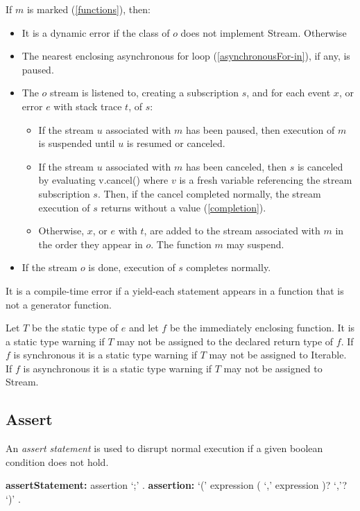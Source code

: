 \documentclass{article}
\newcommand{\code}[1]{{\sf #1}}
\begin{document}
\LMHash{}
If $m$ is marked \ASYNC* (\ref{functions}), then:
\begin{itemize}
\item  It is a dynamic error if the class of $o$ does not implement \code{Stream}. Otherwise
\item The nearest enclosing asynchronous for loop (\ref{asynchronousFor-in}), if any, is paused.
\item The $o$ stream is listened to, creating a subscription $s$, and for each event $x$, or error $e$ with stack trace $t$, of $s$:
\begin{itemize}
\item
If the stream $u$ associated with $m$ has been paused, then execution of $m$ is suspended until $u$ is resumed or canceled.
\item
If the stream $u$ associated with $m$ has been canceled,
then $s$ is canceled by evaluating \code{\AWAIT{} v.cancel()} where $v$ is a fresh variable referencing the stream subscription $s$.
Then, if the cancel completed normally, the stream execution of $s$ returns without a value (\ref{completion}).
\item
Otherwise, $x$, or $e$ with $t$, are added to the stream associated with $m$ in the order they appear in $o$.  The function $m$ may suspend.
\end{itemize}
\item If the stream $o$ is done, execution of $s$ completes normally.
\end{itemize}


\LMHash{}
It is a compile-time error if a yield-each statement appears in a function that is not a generator function.

\LMHash{}
Let $T$ be the static type of $e$ and let $f$ be the immediately enclosing function.  It is a static type warning if $T$ may not be assigned to the declared return type of $f$.  If $f$ is synchronous it is a static  type warning if $T$ may not be assigned to \code{Iterable}.  If $f$ is asynchronous it is a static  type warning if $T$ may not be assigned to \code{Stream}.


\subsection{Assert}

\LMHash{}
An {\em assert statement} is used to disrupt normal execution if a given boolean condition does not hold.

\begin{grammar}
{\bf assertStatement:}
    assertion `{\escapegrammar ;}'
    .
{\bf assertion:}
    \ASSERT{} `(' expression ( `,' expression )? `,'? `)'
    .
\end{grammar}
\end{document}
